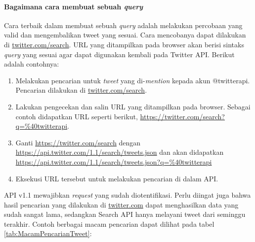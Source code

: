 \paragraph{Bagaimana cara membuat sebuah \textit{query}}
Cara terbaik dalam membuat sebuah \textit{query} adalah melakukan percobaan yang valid dan mengembalikan tweet yang sesuai. Cara mencobanya dapat dilakukan di \url{twitter.com/search}. URL yang ditampilkan pada browser akan berisi sintaks \textit{query} yang sesuai agar dapat digunakan kembali pada Twitter API. Berikut adalah contohnya:

\begin{enumerate}
	\item Melakukan pencarian untuk \textit{tweet} yang di-\textit{mention} kepada akun @twitterapi. Pencarian dilakukan di \url{twitter.com/search}.
	\item Lakukan pengecekan dan salin URL yang ditampilkan pada browser. Sebagai contoh didapatkan URL seperti berikut, \url{https://twitter.com/search?q=\%40twitterapi}.
	\item Ganti \url{https://twitter.com/search} dengan \url{https://api.twitter.com/1.1/search/tweets.json} dan akan didapatkan \url{https://api.twitter.com/1.1/search/tweets.json?q=\%40twitterapi}
	\item Eksekusi URL tersebut untuk melakukan pencarian di dalam API.
\end{enumerate}

API v1.1 mewajibkan \textit{request} yang sudah diotentifikasi. Perlu diingat juga bahwa hasil pencarian yang dilakukan di \url{twitter.com} dapat menghasilkan data yang sudah sangat lama, sedangkan Search API hanya melayani tweet dari seminggu terakhir. Contoh berbagai macam pencarian dapat dilihat pada tabel \ref{tab:MacamPencarianTweet}:

